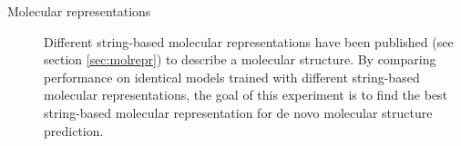 \begin{description}
    \item[Molecular representations]
    Different string-based molecular representations have been published (see section \ref{sec:molrepr}) to describe a molecular structure.
    By comparing performance on identical models trained with different string-based molecular representations,
    the goal of this experiment is to find the best string-based molecular representation for de novo molecular structure prediction.
     
\end{description}

